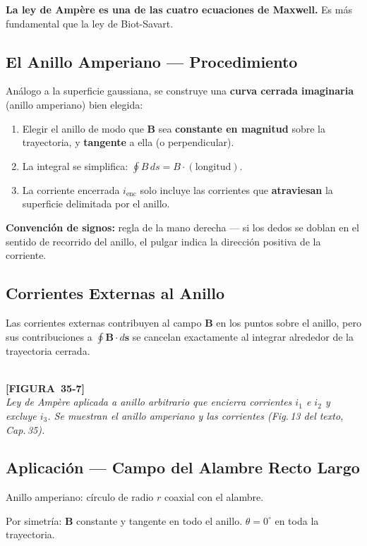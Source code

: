 \documentclass[12pt, letterpaper]{report}
\numberwithin{equation}{section}
\newcommand{\vB}[1]{\boldsymbol{#1}}          %
\newcommand{\figplaceholder}[2]{%
  \begin{tcolorbox}[figbox]
    \centering
    \textcolor{NavyBlue!50}{\rule{0pt}{2.8cm}}\\[4pt]
    {\small\color{NavyBlue}\textbf{[FIGURA\ #1]}\\[2pt]
    \textit{#2}}
  \end{tcolorbox}
}
\begin{document}
\textbf{La ley de Ampère es una de las cuatro ecuaciones de Maxwell.}
Es más fundamental que la ley de Biot-Savart.

\subsection{El Anillo Amperiano — Procedimiento}

Análogo a la superficie gaussiana, se construye una
\textbf{curva cerrada imaginaria} (anillo amperiano) bien elegida:

\begin{enumerate}[leftmargin=2.2em, itemsep=4pt]
  \item Elegir el anillo de modo que $\vB{B}$ sea
        \textbf{constante en magnitud} sobre la trayectoria,
        y \textbf{tangente} a ella (o perpendicular).
  \item La integral se simplifica: $\oint B\,ds=B\cdot(\text{longitud})$.
  \item La corriente encerrada $i_\text{enc}$ solo incluye las corrientes
        que \textbf{atraviesan} la superficie delimitada por el anillo.
\end{enumerate}

\textbf{Convención de signos:} regla de la mano derecha — si los dedos se
doblan en el sentido de recorrido del anillo, el pulgar indica la
dirección positiva de la corriente.

\subsection{Corrientes Externas al Anillo}

Las corrientes externas contribuyen al campo $\vB{B}$ en los puntos
sobre el anillo, pero sus contribuciones a $\oint\vB{B}\cdot d\vB{s}$
se cancelan exactamente al integrar alrededor de la trayectoria cerrada.

\figplaceholder{35-7}{Ley de Ampère aplicada a anillo arbitrario que encierra
corrientes $i_1$ e $i_2$ y excluye $i_3$. Se muestran el anillo amperiano
y las corrientes (Fig.\,13 del texto, Cap.\,35).}

\subsection{Aplicación — Campo del Alambre Recto Largo}

Anillo amperiano: círculo de radio $r$ coaxial con el alambre.

Por simetría: $\vB{B}$ constante y tangente en todo el anillo.
$\theta=0^\circ$ en toda la trayectoria.
\end{document}
